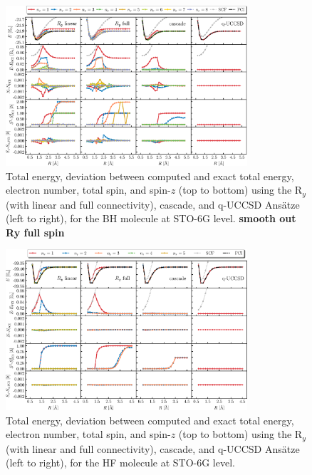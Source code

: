 \documentclass[aps,pra,onecolumn]{revtex4-2}
\newcommand{\todo}[1]{{\bf{{\color{red}#1}}}}
\begin{document}
\begin{figure}[t!]
\includegraphics[width=0.8\textwidth]{../figures/second_quantization_bh/second_quantization_bh.eps}
\caption{Total energy, deviation between computed and exact total energy, electron number, total spin, and spin-$z$ (top to bottom) 
using the R$_y$ (with linear and full connectivity), cascade, and q-UCCSD Ans\"{a}tze (left to right), for the BH molecule at STO-6G level.
\todo{smooth out Ry full spin}
}
\label{figure:second_bh}
\end{figure}

\begin{figure}[t!]
\includegraphics[width=0.8\textwidth]{../figures/second_quantization_hf/second_quantization_hf.eps}
\caption{Total energy, deviation between computed and exact total energy, electron number, total spin, and spin-$z$ (top to bottom) 
using the R$_y$ (with linear and full connectivity), cascade, and q-UCCSD Ans\"{a}tze (left to right), for the HF molecule at STO-6G level.}
\label{figure:second_hf}
\end{figure}
\end{document}
